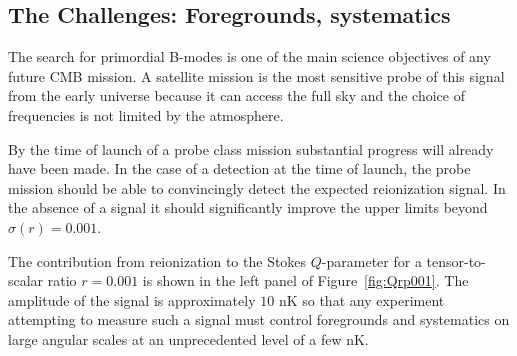 \subsection{The Challenges: Foregrounds, systematics}
\label{sec:foregrounds}
\vspace{-0.05in}

The search for primordial B-modes is one of the main science objectives of any future CMB mission. A satellite mission is the most sensitive probe of this signal from the early universe because it can access the full sky and the choice of frequencies is not limited by the atmosphere. 

By the time of launch of a probe class mission substantial progress will already have been made. In the case of a detection at the time of launch, the probe mission should be able to convincingly detect the expected reionization signal. In the absence of a signal it should significantly improve the upper limits beyond $\sigma(r)=0.001$. 

The contribution from reionization to the Stokes $Q$-parameter for a tensor-to-scalar ratio $r=0.001$ is shown in the left panel of Figure~\ref{fig:Qrp001}. The amplitude of the signal is approximately $10$ nK so that any experiment attempting to measure such a signal must control foregrounds and systematics on large angular scales at an unprecedented level of a few nK. 

